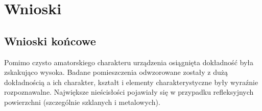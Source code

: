 \section {Wnioski}
\subsection {Wnioski końcowe}
Pomimo czysto amatorskiego charakteru urządzenia osiągnięta dokładność była zskakująco wysoka. Badane pomieszczenia odwzorowane zostały z dużą dokładnością a ich charakter, kształt i elementy charakterystyczne były wyraźnie rozpoznawalne. Największe nieścisłości pojawiały się w przypadku refleksyjnych powierzchni (szczególnie szklanych i metalowych).

